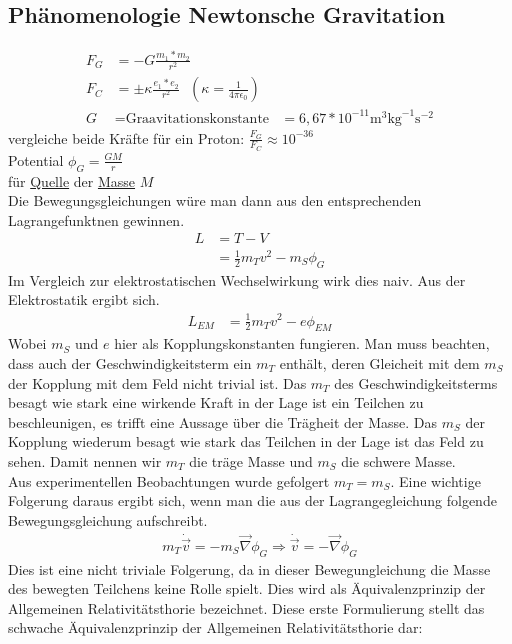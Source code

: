 \documentclass[a4paper]{article}
\begin{document}
\subsection{Phänomenologie Newtonsche Gravitation}
\begin{align}
F_G&=-G\frac{m_1*m_2}{r^2}\\
F_C&=\pm\kappa\frac{e_1*e_2}{r^2} \ \ \ \left( \kappa=\frac{1}{4\pi\epsilon_0}
\right)\\
G&=\text{Graavitationskonstante}
&=6,67*10^{-11}\mathrm{m}^3 \mathrm{kg}^{-1} \mathrm{s}^{-2}
\end{align}
vergleiche beide Kräfte für ein Proton: $\frac{F_G}{F_C}\approx10^{-36}$\\
Potential $\phi_G=\frac{GM}{r}$\\
für \underline{Quelle} der \underline{Masse} $M$\\
Die Bewegungsgleichungen würe man dann aus den entsprechenden Lagrangefunktnen
gewinnen.
\begin{align}
L&=T-V\\
&=\frac{1}{2}m_Tv^2-m_S\phi_G
\end{align}
Im Vergleich zur elektrostatischen Wechselwirkung wirk dies naiv. Aus der
Elektrostatik ergibt sich.
\begin{align}
L_{EM}&=\frac{1}{2}m_Tv^2-e\phi_{EM}
\end{align}
Wobei $m_S$ und $e$ hier als Kopplungskonstanten fungieren.
Man muss beachten, dass auch der Geschwindigkeitsterm ein $m_T$ enthält, deren
Gleicheit mit dem $m_S$ der Kopplung mit dem Feld nicht trivial ist. Das $m_T$
des Geschwindigkeitsterms besagt wie stark eine wirkende Kraft in der Lage ist ein
Teilchen zu beschleunigen, es trifft eine Aussage über die Trägheit der Masse.
Das $m_S$ der Kopplung wiederum besagt wie stark das Teilchen in der Lage ist
das Feld zu sehen. Damit nennen wir $m_T$ die träge Masse und $m_S$ die schwere
Masse.\\
Aus experimentellen Beobachtungen wurde gefolgert $m_T=m_S$. Eine wichtige
Folgerung daraus ergibt sich, wenn man die aus der Lagrangegleichung folgende
Bewegungsgleichung aufschreibt.
\begin{align}
m_T \dot{\vec{v}}=-m_S \vec{\nabla}\phi_G
\Rightarrow \dot{\vec{v}}=- \vec{\nabla}\phi_G
\end{align}
Dies ist eine nicht triviale Folgerung, da in dieser Bewegungleichung die Masse
des bewegten Teilchens keine Rolle spielt. Dies wird als Äquivalenzprinzip der
Allgemeinen Relativitätsthorie bezeichnet. Diese erste Formulierung stellt das
schwache Äquivalenzprinzip der Allgemeinen Relativitätsthorie dar:\\
\\
\end{document}
